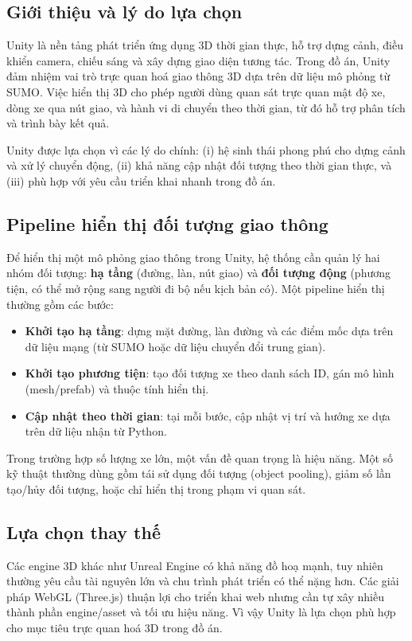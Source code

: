 \documentclass[../DoAn.tex]{subfiles}
\begin{document}
\subsection{Giới thiệu và lý do lựa chọn}
Unity là nền tảng phát triển ứng dụng 3D thời gian thực, hỗ trợ dựng cảnh, điều khiển camera, chiếu sáng và xây dựng giao diện tương tác. Trong đồ án, Unity đảm nhiệm vai trò trực quan hoá giao thông 3D dựa trên dữ liệu mô phỏng từ SUMO. Việc hiển thị 3D cho phép người dùng quan sát trực quan mật độ xe, dòng xe qua nút giao, và hành vi di chuyển theo thời gian, từ đó hỗ trợ phân tích và trình bày kết quả.

Unity được lựa chọn vì các lý do chính: (i) hệ sinh thái phong phú cho dựng cảnh và xử lý chuyển động, (ii) khả năng cập nhật đối tượng theo thời gian thực, và (iii) phù hợp với yêu cầu triển khai nhanh trong đồ án.

\subsection{Pipeline hiển thị đối tượng giao thông}
Để hiển thị một mô phỏng giao thông trong Unity, hệ thống cần quản lý hai nhóm đối tượng: \textbf{hạ tầng} (đường, làn, nút giao) và \textbf{đối tượng động} (phương tiện, có thể mở rộng sang người đi bộ nếu kịch bản có). Một pipeline hiển thị thường gồm các bước:
\begin{itemize}[leftmargin=2em]
	\item \textbf{Khởi tạo hạ tầng}: dựng mặt đường, làn đường và các điểm mốc dựa trên dữ liệu mạng (từ SUMO hoặc dữ liệu chuyển đổi trung gian).
	\item \textbf{Khởi tạo phương tiện}: tạo đối tượng xe theo danh sách ID, gán mô hình (mesh/prefab) và thuộc tính hiển thị.
	\item \textbf{Cập nhật theo thời gian}: tại mỗi bước, cập nhật vị trí và hướng xe dựa trên dữ liệu nhận từ Python.
\end{itemize}

Trong trường hợp số lượng xe lớn, một vấn đề quan trọng là hiệu năng. Một số kỹ thuật thường dùng gồm tái sử dụng đối tượng (object pooling), giảm số lần tạo/hủy đối tượng, hoặc chỉ hiển thị trong phạm vi quan sát.

\subsection{Lựa chọn thay thế}
Các engine 3D khác như Unreal Engine có khả năng đồ hoạ mạnh, tuy nhiên thường yêu cầu tài nguyên lớn và chu trình phát triển có thể nặng hơn. Các giải pháp WebGL (Three.js) thuận lợi cho triển khai web nhưng cần tự xây nhiều thành phần engine/asset và tối ưu hiệu năng. Vì vậy Unity là lựa chọn phù hợp cho mục tiêu trực quan hoá 3D trong đồ án.
\end{document}
